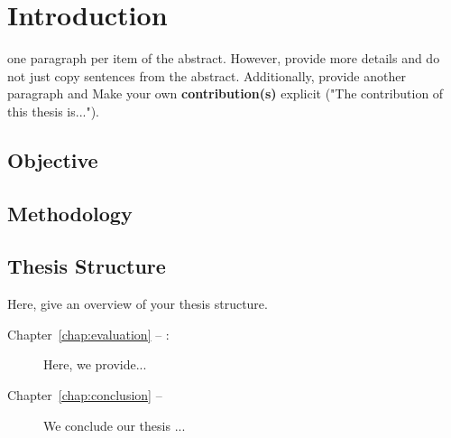 
\chapter{Introduction}
one paragraph per item of the abstract. However, provide more details and do not just copy sentences from the abstract. 
Additionally, provide  another paragraph and  Make your own \textbf{contribution(s)} explicit ("The contribution of this thesis is...").

\section{Objective}

\section{Methodology}

\section*{Thesis Structure}
Here, give an overview of your thesis structure.
\begin{description}
\item[Chapter~\ref{chap:evaluation} -- :] Here, we provide...
\item[Chapter~\ref{chap:conclusion} -- ] We conclude our thesis ...
\end{description}
